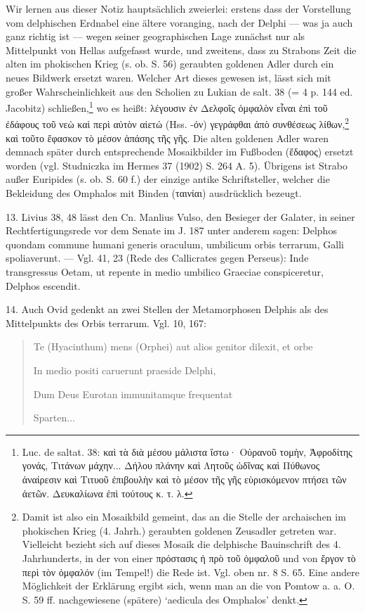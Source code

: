 \documentclass[a4paper, 11pt, oneside]{article}
\begin{document}
Wir lernen aus dieser Notiz hauptsächlich zweierlei: erstens dass der Vorstellung vom delphischen Erdnabel eine ältere voranging, nach der Delphi --- was ja auch ganz richtig ist --- wegen seiner geographischen Lage zunächst nur als Mittelpunkt von Hellas aufgefasst wurde, und zweitens, dass zu Strabons Zeit die alten im phokischen Krieg (s. ob. S. 56) geraubten goldenen Adler durch ein neues Bildwerk ersetzt waren. Welcher Art dieses gewesen ist, lässt sich mit großer Wahrscheinlichkeit aus den Scholien zu Lukian de salt. 38 (= 4 p. 144 ed. Jacobitz) schließen,\footnote{Luc. de saltat. 38: καὶ τὰ διὰ μέσου μάλιστα ἴστω· Οὐρανοῦ τομὴν, Ἀφροδίτης γονάς, Τιτάνων μάχην... Δήλου πλάνην καὶ Λητοῦς ὠδῖνας καὶ Πύθωνος ἀναίρεσιν καὶ Τιτυοῦ ἐπιβουλὴν καὶ τὸ μέσον τῆς γῆς εὑρισκόμενον πτήσει τῶν ἀετῶν. Δευκαλίωνα ἐπὶ τούτους κ. τ. λ.} wo es heißt: λέγουσιν ἐν Δελφοῖς ὀμφαλὸν εἶναι ἐπὶ τοῦ ἐδάφους τοῦ νεὼ καὶ περὶ αὐτὸν αἰετώ (Hss. -όν) γεγράφθαι ἀπὸ συνθέσεως λίθων,\footnote{Damit ist also ein Mosaikbild gemeint, das an die Stelle der archaischen im phokischen Krieg (4. Jahrh.) geraubten goldenen Zeusadler getreten war. Vielleicht bezieht sich auf dieses Mosaik die delphische Bauinschrift des 4. Jahrhunderts, in der von einer πρόστασις ἡ πρὸ τοῦ ὀμφαλοῦ und von ἔργον τὸ περὶ τὸν ὀμφαλόν (im Tempel!) die Rede ist. Vgl. oben nr. 8 S. 65. Eine andere Möglichkeit der Erklärung ergibt sich, wenn man an die von Pomtow a. a. O. S. 59 ff. nachgewiesene (spätere) `aedicula des Omphalos' denkt.} καὶ τοῦτο ἔφασκον τὸ μέσον ἁπάσης τῆς γῆς. Die alten goldenen Adler waren demnach später durch entsprechende Mosaikbilder im Fußboden (ἔδαφος) ersetzt worden (vgl. Studniczka im Hermes 37 (1902) S. 264 A. 5). Übrigens ist Strabo außer Euripides (s. ob. S. 60 f.) der einzige antike Schriftsteller, welcher die Bekleidung des Omphalos mit Binden (ταινίαι) ausdrücklich bezeugt.

13. Livius 38, 48 lässt den Cn. Manlius Vulso, den Besieger der Galater, in seiner Rechtfertigungsrede vor dem Senate im J. 187 unter anderem sagen: Delphos quondam commune humani generis oraculum, umbilicum orbis terrarum, Galli spoliaverunt. --- Vgl. 41, 23 (Rede des Callicrates gegen Perseus): Inde transgressus Oetam, ut repente in medio umbilico Graeciae conspiceretur, Delphos escendit.

14. Auch Ovid gedenkt an zwei Stellen der Metamorphosen Delphis als des Mittelpunkts des Orbis terrarum. Vgl. 10, 167:
\begin{quotation}
Te (Hyacinthum) mens (Orphei) aut alios genitor dilexit, et orbe

In medio positi caruerunt praeside Delphi,

Dum Deus Eurotan immunitamque frequentat

Sparten...
\end{quotation}
\end{document}

